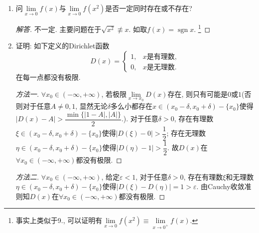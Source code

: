 \documentclass[a4paper,11pt,twoside]{ctexbook}
\DeclareMathOperator{\sgn}{sgn}
\begin{document}
\begin{enumerate}
\begin{proof}
		      若$\lim\limits_{x\to 0} f(x^3)=A$, 则
		      \begin{enumerate}[(a)]
			      \item 对于任意给定的$\varepsilon>0$, 存在$\delta>0$, 使得当$0<|x|<\delta$时, $|f(x^3)-A|<\varepsilon$;
			      \item 对于任意给定的$\delta>0$, 存在$\eta>0$, 使得当$0<|x|<\eta$时, $|\sqrt[3]{x}|<\delta$.
		      \end{enumerate}
		      注意$x\neq 0$时, $\sqrt[3]{x}\neq 0$, 故当$0<|x|<\eta$时, $0<|\sqrt[3]{x}|<\delta$, 从而当$0<|x|<\eta$时有
		      \[
			      |f(x)-A|=|f((\sqrt[3]{x})^3)-A|<\varepsilon.
		      \]
		      这就证明了$\lim\limits_{x\to 0} f(x)$与$\lim\limits_{x\to 0} f(x^3)$同时存在或不存在, 而当它们存在时必相等. \qedhere
	      \end{proof}

	\item 问$\lim\limits_{x\to 0} f(x)$与$\lim\limits_{x\to 0} f(x^2)$是否一定同时存在或不存在?
	      \begin{proof}[解答]
		      不一定. 主要问题在于$\sqrt{x^2}\not\equiv x$. 如取$f(x)=\sgn{x}$. \footnote{事实上类似于9., 可以证明有$\lim\limits_{x\to 0} f(x^2)\equiv\lim\limits_{x\to 0^{+}} f(x)$.}
	      \end{proof}

	\item 证明: 如下定义的Dirichlet函数
	      \[
		      D(x)=\begin{cases} 1, & \text{$x$是有理数}, \\ 0, & \text{$x$是无理数}.\end{cases}
	      \]
	      在每一点都没有极限.
	      \begin{proof}[方法一]
		      $\forall x_0\in(-\infty,+\infty)$, 若极限$\lim\limits_{x\to x_0} D(x)$存在, 则只有可能是$0$或$1$(否则对于任意$A\neq 0,1$, 显然无论$\delta$多么小都存在$x\in(x_0-\delta,x_0+\delta)-\{x_0\}$使得$|D(x)-A|>\dfrac{\min\{|1-A|,|A|\}}{2}$.).
		      对于任意$\delta>0$, 存在有理数$\xi\in(x_0-\delta,x_0+\delta)-\{x_0\}$使得$|D(\xi)-0|>\dfrac{1}{2}$; 存在无理数$\eta\in(x_0-\delta,x_0+\delta)-\{x_0\}$使得$|D(\eta)-1|>\dfrac{1}{2}$. 故$D(x)$在$\forall x_0\in(-\infty,+\infty)$都没有极限. \qedhere
	      \end{proof}

	      \begin{proof}[方法二]
		      $\forall x_0\in(-\infty,+\infty)$, 给定$\varepsilon<1$, 对于任意$\delta>0$, 存在有理数$\xi$和无理数$\eta\in(x_0-\delta,x_0+\delta)-\{x_0\}$使得$|D(\xi)-D(\eta)|=1>\varepsilon$. 由Cauchy收敛准则知$D(x)$在$\forall x_0\in(-\infty,+\infty)$都没有极限. \qedhere\qedhere
	      \end{proof}


\end{enumerate}
\end{document}
